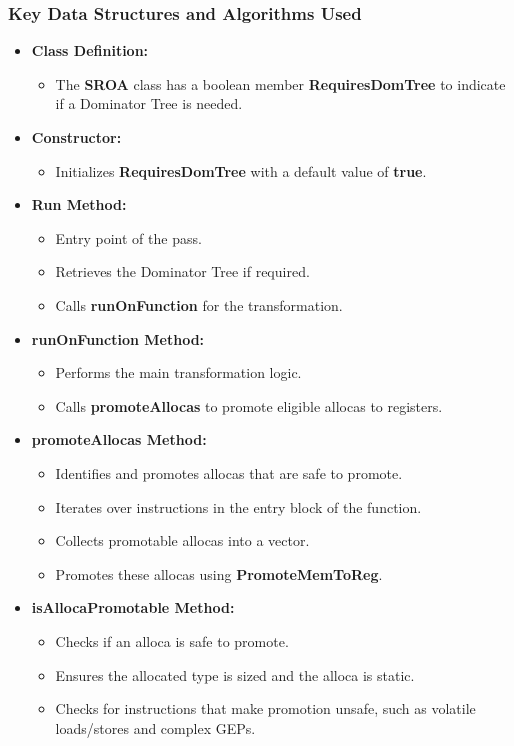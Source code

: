 \documentclass[conference]{IEEEtran}
\begin{document}
\subsubsection{Key Data Structures and Algorithms Used}
\begin{itemize}
	\item \textbf{Class Definition:}
	      \begin{itemize}
		      \item The \textbf{SROA} class has a boolean member \textbf{RequiresDomTree} to indicate if a Dominator Tree is needed.
	      \end{itemize}
	\item \textbf{Constructor:}
	      \begin{itemize}
		      \item Initializes \textbf{RequiresDomTree} with a default value of \textbf{true}.
	      \end{itemize}
	\item \textbf{Run Method:}
	      \begin{itemize}
		      \item Entry point of the pass.
		      \item Retrieves the Dominator Tree if required.
		      \item Calls \textbf{runOnFunction} for the transformation.
	      \end{itemize}
	\item \textbf{runOnFunction Method:}
	      \begin{itemize}
		      \item Performs the main transformation logic.
		      \item Calls \textbf{promoteAllocas} to promote eligible allocas to registers.
	      \end{itemize}
	\item \textbf{promoteAllocas Method:}
	      \begin{itemize}
		      \item Identifies and promotes allocas that are safe to promote.
		      \item Iterates over instructions in the entry block of the function.
		      \item Collects promotable allocas into a vector.
		      \item Promotes these allocas using \textbf{PromoteMemToReg}.
	      \end{itemize}
	\item \textbf{isAllocaPromotable Method:}
	      \begin{itemize}
		      \item Checks if an alloca is safe to promote.
		      \item Ensures the allocated type is sized and the alloca is static.
		      \item Checks for instructions that make promotion unsafe, such as volatile loads/stores and complex GEPs.
	      \end{itemize}
\end{itemize}
\end{document}
